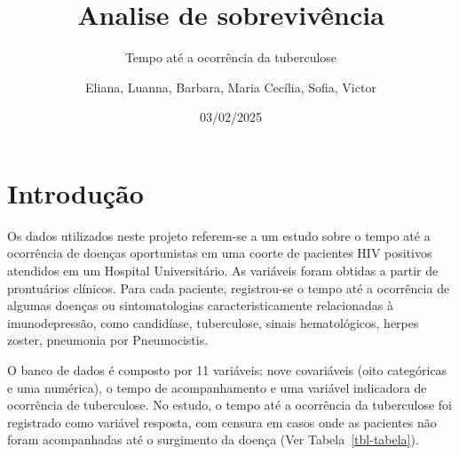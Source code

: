 \documentclass[
  letterpaper,
  DIV=11,
  numbers=noendperiod]{scrreprt}
\title{Analise de sobrevivência}
\subtitle{Tempo até a ocorrência da tuberculose}
\author{Eliana, Luanna, Barbara, Maria Cecília, Sofia, Victor}
\date{03/02/2025}
\renewcommand*\contentsname{Índice}
\newcommand\contentsname{Índice}
\begin{document}
\maketitle

\renewcommand*\contentsname{Índice}
{
\hypersetup{linkcolor=}
\setcounter{tocdepth}{2}
\tableofcontents
}
\chapter{Introdução}\label{introduuxe7uxe3o}

Os dados utilizados neste projeto referem-se a um estudo sobre o tempo
até a ocorrência de doenças oportunistas em uma coorte de pacientes HIV
positivos atendidos em um Hospital Universitário. As variáveis foram
obtidas a partir de prontuários clínicos. Para cada paciente,
registrou-se o tempo até a ocorrência de algumas doenças ou
sintomatologias caracteristicamente relacionadas à imunodepressão, como
candidíase, tuberculose, sinais hematológicos, herpes zoster, pneumonia
por Pneumocistis.

O banco de dados é composto por 11 variáveis: nove covariáveis (oito
categóricas e uma numérica), o tempo de acompanhamento e uma variável
indicadora de ocorrência de tuberculose. No estudo, o tempo até a
ocorrência da tuberculose foi registrado como variável resposta, com
censura em casos onde as pacientes não foram acompanhadas até o
surgimento da doença (Ver Tabela~\ref{tbl-tabela}).
\end{document}
